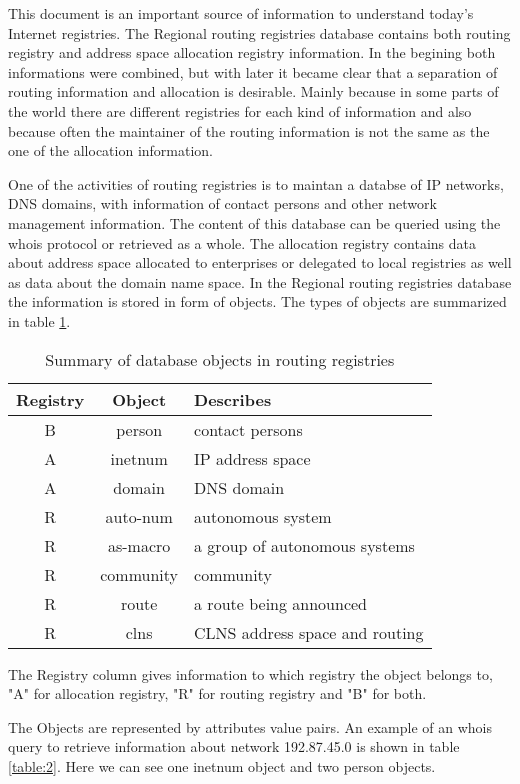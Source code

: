 \documentclass[11pt,a4paper]{scrreprt}
\begin{document}
This document is an important source of information to understand today's Internet registries. 
The Regional routing registries database contains both routing registry and address space allocation registry information. In the begining both informations were combined, but with later it became clear that a separation
of routing information and allocation is desirable. Mainly because in some parts of the world there are different registries for each kind of information and also because often the maintainer of the routing information is not the same as the one of the allocation information.

One of the activities of routing registries is to maintan a databse of IP networks, DNS domains, with information of contact persons and other network management information. The content of this database can be queried using the whois protocol or retrieved as a whole.
The allocation registry contains data about address space allocated to enterprises or delegated to local registries as well as data about the domain name space. 
In the Regional routing registries database the information is stored in form of objects. The types of objects are summarized in table \ref{table:1}.   
   
\begin{table}[h!]
\centering
\begin{tabular}{ | c | c | l | }
\hline
 Registry & Object & Describes \\ \hline
 B & person & contact persons \\
 A & inetnum & IP address space \\
 A & domain & DNS domain \\
 R & auto-num & autonomous system \\
 R & as-macro & a group of autonomous systems \\
 R & community & community \\
 R & route & a route being announced \\
 R & clns & CLNS address space and routing \\
 \hline
\end{tabular}
\caption{Summary of database objects in routing registries}
\label{table:1}
\end{table}

The Registry column gives information to which registry the object belongs to, "A" for allocation registry, "R" for routing registry and "B" for both.

The Objects are represented by attributes value pairs. 
An example of an whois query to retrieve information about network 192.87.45.0 is shown in table \ref{table:2}. Here we can see one inetnum object and two person objects.
\end{document}
